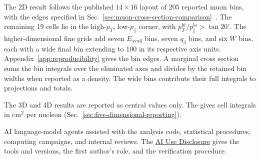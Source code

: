 \label{sec:method-binning}
The 2D result follows the published $14\times16$ layout of 205 reported muon bins, with the edges specified in Sec.~\ref{sec:muon-cross-section-comparison}~\cite{MINERvA:2021owq}. The remaining 19 cells lie in the high-$p_T$, low-$p_\parallel$ corner, with $p_T^{\mathrm{hi}}/p_\parallel^{\mathrm{lo}}>\tan20^\circ$. The higher-dimensional fine grids add seven $E_{\mathrm{avail}}$ bins, seven $q_3$ bins, and six $W$ bins, each with a wide final bin extending to 100 in its respective axis units. Appendix~\ref{app:reproducibility} gives the bin edges. A marginal cross section sums the bin integrals over the eliminated axes and divides by the retained bin widths when reported as a density. The wide bins contribute their full integrals to projections and totals.

The 3D and 4D results are reported as central values only. The \resSixteen{} gives cell integrals in $\mathrm{cm}^2$ per nucleon (Sec.~\ref{sec:five-dimensional-reporting}).

AI language-model agents assisted with the analysis code, statistical procedures, computing campaigns, and internal reviews. The \hyperref[sec:ai-use-disclosure]{AI Use Disclosure} gives the tools and versions, the first author's role, and the verification procedure.

